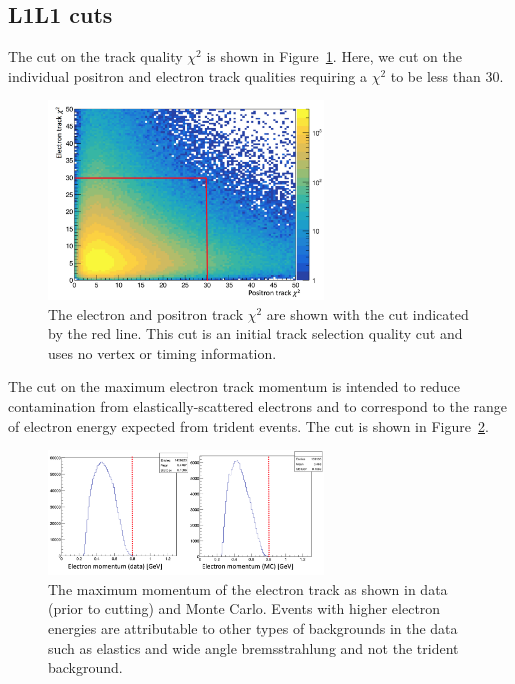 \subsection{L1L1 cuts}
The cut on the track quality $\chi^2$ is shown in Figure~\ref{fig:trkChi2}. Here, we cut on the individual positron and electron track qualities requiring a $\chi^2$ to be less than 30. 

\begin{figure}[H]
  \centering
      \includegraphics[width=0.65\textwidth]{pics/searching/trkChi2.png}
  \caption[Track $\chi^2$ cut]{The electron and positron track $\chi^2$ are shown with the cut indicated by the red line. This cut is an initial track selection quality cut and uses no vertex or timing information.}
  \label{fig:trkChi2}
\end{figure} 

The cut on the maximum electron track momentum is intended to reduce contamination from elastically-scattered electrons and to correspond to the range of electron energy expected from trident events.  The cut is shown in Figure~\ref{fig:emTrkPmax}.

\begin{figure}[H]
  \centering
      \includegraphics[width=0.65\textwidth]{pics/searching/emTrkPmax.png}
  \caption[Maximum $e^-$ track momentum]{The maximum momentum of the electron track as shown in data (prior to cutting) and Monte Carlo. Events with higher electron energies are attributable to other types of backgrounds in the data such as elastics and wide angle bremsstrahlung and not the trident background.}
  \label{fig:emTrkPmax}
\end{figure} 

